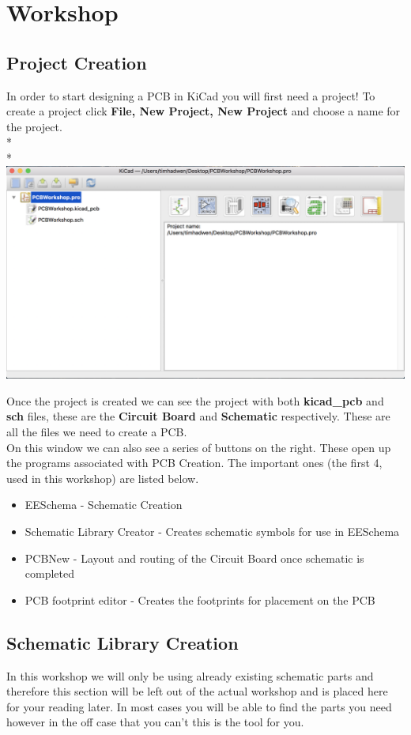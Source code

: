 \section{Workshop}
\subsection{Project Creation}
In order to start designing a PCB in KiCad you will first need a project! To create a project click \textbf{File, New Project, New Project} and choose a name for the project.
\\*\\*
\includegraphics[width=\textwidth]{newproject}

Once the project is created we can see the project with both \textbf{kicad\_pcb} and \textbf{sch} files, these are the \textbf{Circuit Board} and \textbf{Schematic} respectively. These are all the files we need to create a PCB.\\

On this window we can also see a series of buttons on the right. These open up the programs associated with PCB Creation. The important ones (the first 4, used in this workshop) are listed below.

\begin{itemize}
	\item EESchema - Schematic Creation
	\item Schematic Library Creator - Creates schematic symbols for use in EESchema
	\item PCBNew - Layout and routing of the Circuit Board once schematic is completed
	\item PCB footprint editor - Creates the footprints for placement on the PCB
\end{itemize}

\subsection{Schematic Library Creation}
In this workshop we will only be using already existing schematic parts and therefore this section will be left out of the actual workshop and is placed here for your reading later. In most cases you will be able to find the parts you need however in the off case that you can't this is the tool for you.

